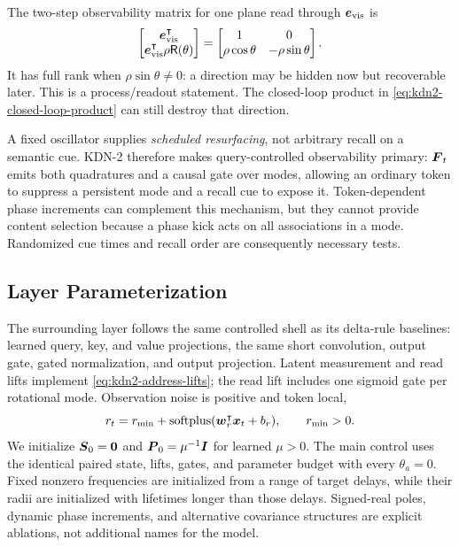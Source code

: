 \documentclass[11pt,letterpaper,logo]{yalearxiv}
\newcommand{\Rot}{\mathsf{R}}
\begin{document}
The two-step observability matrix for one plane read through $\boldsymbol{e}_{\mathrm{vis}}$ is
\begin{equation}
  \begin{bmatrix}
    \ve{e}_{\mathrm{vis}}^{\tr}\\
    \ve{e}_{\mathrm{vis}}^{\tr}\rho\Rot(\theta)
  \end{bmatrix}
  =
  \begin{bmatrix}
    1&0\\
    \rho\cos\theta&-\rho\sin\theta
  \end{bmatrix}.
  \label{eq:kdn2-observability}
\end{equation}
It has full rank when $\rho\sin\theta\neq0$: a direction may be hidden now but recoverable later.
This is a process/readout statement. The closed-loop product in
\eqref{eq:kdn2-closed-loop-product} can still destroy that direction.

A fixed oscillator supplies \emph{scheduled resurfacing}, not arbitrary recall on a semantic cue.
KDN-2 therefore makes query-controlled observability primary: $\boldsymbol{F}_t$ emits both quadratures
and a causal gate over modes, allowing an ordinary token to suppress a persistent mode and a
recall cue to expose it. Token-dependent phase increments can complement this mechanism, but they
cannot provide content selection because a phase kick acts on all associations in a mode.
Randomized cue times and recall order are consequently necessary tests.

\subsection{Layer Parameterization}
\label{sec:kdn2-layer}

The surrounding layer follows the same controlled shell as its delta-rule baselines: learned
query, key, and value projections, the same short convolution, output gate, gated normalization,
and output projection. Latent measurement and read lifts implement \eqref{eq:kdn2-address-lifts};
the read lift includes one sigmoid gate per rotational mode. Observation noise is positive and
token local,
\begin{equation}
  r_t
  =
  r_{\min}
  +
  \operatorname{softplus}(\boldsymbol{w}_r^{\intercal}\boldsymbol{x}_t+b_r),
  \qquad r_{\min}>0.
  \label{eq:kdn2-noise-parameterization}
\end{equation}
We initialize $\boldsymbol{S}_0=\boldsymbol{0}$ and
$\boldsymbol{P}_0=\mu^{-1}\boldsymbol{I}$ for learned $\mu>0$. The main control uses the identical paired state,
lifts, gates, and parameter budget with every $\theta_a=0$. Fixed nonzero frequencies are
initialized from a range of target delays, while their radii are initialized with lifetimes
longer than those delays. Signed-real poles, dynamic phase increments, and alternative covariance
structures are explicit ablations, not additional names for the model.
\end{document}
